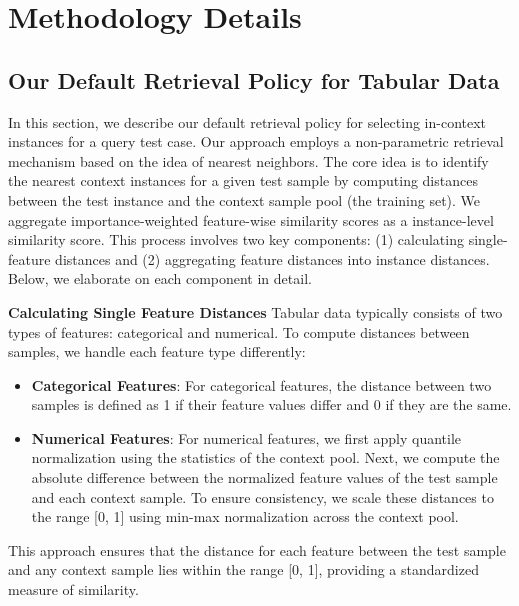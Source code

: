 \section{Methodology Details}

\subsection{Our Default Retrieval Policy for Tabular Data}
\label{app:rag_method}
In this section, we describe our default retrieval policy for selecting in-context instances for a query test case.
Our approach employs a non-parametric retrieval mechanism based on the idea of nearest neighbors.
The core idea is to identify the nearest context instances for a given test sample by computing distances between the test instance and the context sample pool (the training set).
We aggregate importance-weighted feature-wise similarity scores as a instance-level similarity score.
This process involves two key components: (1) calculating single-feature distances and (2) aggregating feature distances into instance distances. Below, we elaborate on each component in detail.

\textbf{Calculating Single Feature Distances}
Tabular data typically consists of two types of features: categorical and numerical. To compute distances between samples, we handle each feature type differently:
\begin{itemize}
    \item \textbf{Categorical Features}: For categorical features, the distance between two samples is defined as 1 if their feature values differ and 0 if they are the same.
    \item \textbf{Numerical Features}: For numerical features, we first apply quantile normalization using the statistics of the context pool. Next, we compute the absolute difference between the normalized feature values of the test sample and each context sample. To ensure consistency, we scale these distances to the range [0, 1] using min-max normalization across the context pool.
\end{itemize}
This approach ensures that the distance for each feature between the test sample and any context sample lies within the range [0, 1], providing a standardized measure of similarity.

